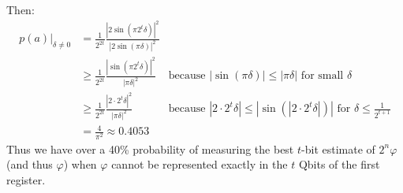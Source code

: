 \documentclass{article}
\begin{document}
\begin{enumerate}[label=\textbf{(\arabic*)}]
Then:
\begin{align}
    p(a)\rvert_{\delta\ne 0}
    &=
    \frac{1}{2^{2t}}
    \frac{|2\sin(\pi 2^t \delta)|^2}
    {|2\sin(\pi \delta)|^2}\\
    &\ge
    \frac{1}{2^{2t}}
    \frac{|\sin(\pi 2^t \delta)|^2}
    {|\pi \delta|^2} &
    \text{because }|\sin(\pi \delta)| \le |\pi\delta| \text{ for small } \delta\\
    &\ge
    \frac{1}{2^{2t}}
    \frac{|2\cdot 2^t \delta|^2}
    {|\pi \delta|^2} &
    \text{because }|2\cdot 2^t \delta| \le |\sin(|2\cdot 2^t \delta|)| \text{ for } \delta\le\frac{1}{2^{t+1}}\\
    &=
    \frac{4}{\pi^2} \approx 0.4053
\end{align}
Thus we have over a 40\% probability of measuring the best $t$-bit estimate of $2^n\varphi$ (and thus $\varphi$) when $\varphi$ cannot be represented exactly in the $t$ Qbits of the first register.


\end{enumerate}

\printbibliography
\end{document}

